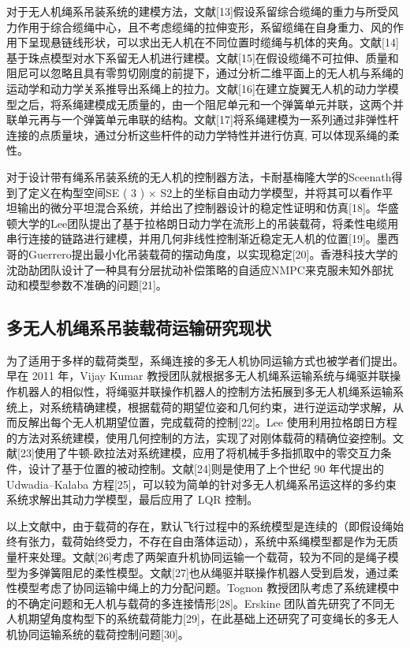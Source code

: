 \documentclass[lang=chs, degree=master, blindreview=false, winfonts=true]{yanputhesis}
\begin{document}
对于无人机绳系吊装系统的建模方法，文献[13]假设系留综合缆绳的重力与所受风力作用于综合缆绳中心，且不考虑缆绳的拉伸变形，系留缆绳在自身重力、风的作用下呈现悬链线形状，可以求出无人机在不同位置时缆绳与机体的夹角。文献[14]基于珠点模型对水下系留无人机进行建模。文献[15]在假设缆绳不可拉伸、质量和阻尼可以忽略且具有零剪切刚度的前提下，通过分析二维平面上的无人机与系绳的运动学和动力学关系推导出系绳上的拉力。文献[16]在建立旋翼无人机的动力学模型之后，将系绳建模成无质量的，由一个阻尼单元和一个弹簧单元并联，这两个并联单元再与一个弹簧单元串联的结构。文献[17]将系绳建模为一系列通过非弹性杆连接的点质量块，通过分析这些杆件的动力学特性并进行仿真, 可以体现系绳的柔性。

对于设计带有绳系吊装系统的无人机的控制器方法，卡耐基梅隆大学的Sceenath得到了定义在构型空间SE ( 3 ) × S2上的坐标自由动力学模型，并将其可以看作平坦输出的微分平坦混合系统，并给出了控制器设计的稳定性证明和仿真[18]。华盛顿大学的Lee团队提出了基于拉格朗日动力学在流形上的吊装载荷，将柔性电缆用串行连接的链路进行建模，并用几何非线性控制渐近稳定无人机的位置[19]。墨西哥的Guerrero提出最小化吊装载荷的摆动角度，以实现稳定[20]。香港科技大学的沈劭劼团队设计了一种具有分层扰动补偿策略的自适应NMPC来克服未知外部扰动和模型参数不准确的问题[21]。


\subsection{多无人机绳系吊装载荷运输研究现状}
为了适用于多样的载荷类型，系绳连接的多无人机协同运输方式也被学者们提出。早在 2011 年，Vijay Kumar 教授团队就根据多无人机绳系运输系统与绳驱并联操作机器人的相似性，将绳驱并联操作机器人的控制方法拓展到多无人机绳系运输系统上，对系统精确建模，根据载荷的期望位姿和几何约束，进行逆运动学求解，从而反解出每个无人机期望位置，完成载荷的控制[22]。Lee 使用利用拉格朗日方程的方法对系统建模，使用几何控制的方法，实现了对刚体载荷的精确位姿控制。文献[23]使用了牛顿-欧拉法对系统建模，应用了将机械手多指抓取中的零交互力条件，设计了基于位置的被动控制。文献[24]则是使用了上个世纪 90 年代提出的 Udwadia–Kalaba 方程[25]，可以较为简单的针对多无人机绳系吊运这样的多约束系统求解出其动力学模型，最后应用了 LQR 控制。

以上文献中，由于载荷的存在，默认飞行过程中的系统模型是连续的（即假设绳始终有张力，载荷始终受力，不存在自由落体运动），系统中系绳模型都是作为无质量杆来处理。文献[26]考虑了两架直升机协同运输一个载荷，较为不同的是绳子模型为多弹簧阻尼的柔性模型。文献[27]也从绳驱并联操作机器人受到启发，通过柔性模型考虑了协同运输中绳上的力分配问题。Tognon 教授团队考虑了系统建模中的不确定问题和无人机与载荷的多连接情形[28]。Erskine 团队首先研究了不同无人机期望角度构型下的系统载荷能力[29]，在此基础上还研究了可变绳长的多无人机协同运输系统的载荷控制问题[30]。
\end{document}
